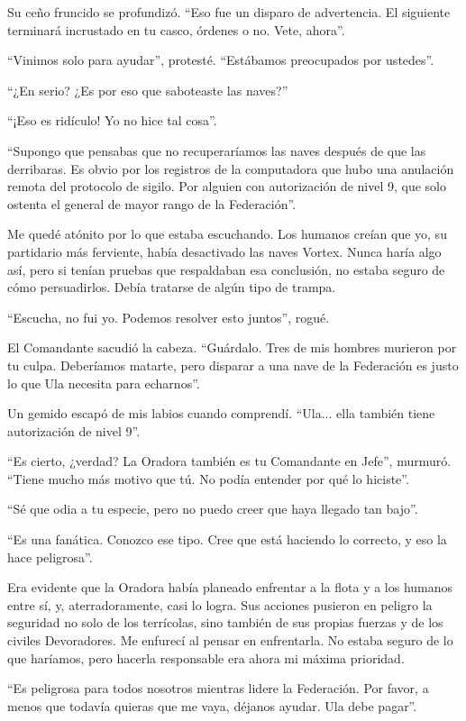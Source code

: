 Su ceño fruncido se profundizó. ``Eso fue un disparo de advertencia. El siguiente terminará incrustado en tu casco, órdenes o no. Vete, ahora''.

``Vinimos solo para ayudar'', protesté. ``Estábamos preocupados por ustedes''.

``¿En serio? ¿Es por eso que saboteaste las naves?''

``¡Eso es ridículo! Yo no hice tal cosa''.

``Supongo que pensabas que no recuperaríamos las naves después de que las derribaras. Es obvio por los registros de la computadora que hubo una anulación remota del protocolo de sigilo. Por alguien con autorización de nivel 9, que solo ostenta el general de mayor rango de la Federación''.

Me quedé atónito por lo que estaba escuchando. Los humanos creían que yo, su partidario más ferviente, había desactivado las naves Vortex. Nunca haría algo así, pero si tenían pruebas que respaldaban esa conclusión, no estaba seguro de cómo persuadirlos. Debía tratarse de algún tipo de trampa.

``Escucha, no fui yo. Podemos resolver esto juntos'', rogué.

El Comandante sacudió la cabeza. ``Guárdalo. Tres de mis hombres murieron por tu culpa. Deberíamos matarte, pero disparar a una nave de la Federación es justo lo que Ula necesita para echarnos''.

Un gemido escapó de mis labios cuando comprendí. ``Ula... ella también tiene autorización de nivel 9''.

``Es cierto, ¿verdad? La Oradora también es tu Comandante en Jefe'', murmuró. ``Tiene mucho más motivo que tú. No podía entender por qué lo hiciste''.

``Sé que odia a tu especie, pero no puedo creer que haya llegado tan bajo''.

``Es una fanática. Conozco ese tipo. Cree que está haciendo lo correcto, y eso la hace peligrosa''.

Era evidente que la Oradora había planeado enfrentar a la flota y a los humanos entre sí, y, aterradoramente, casi lo logra. Sus acciones pusieron en peligro la seguridad no solo de los terrícolas, sino también de sus propias fuerzas y de los civiles Devoradores. Me enfurecí al pensar en enfrentarla. No estaba seguro de lo que haríamos, pero hacerla responsable era ahora mi máxima prioridad.

``Es peligrosa para todos nosotros mientras lidere la Federación. Por favor, a menos que todavía quieras que me vaya, déjanos ayudar. Ula debe pagar''.

